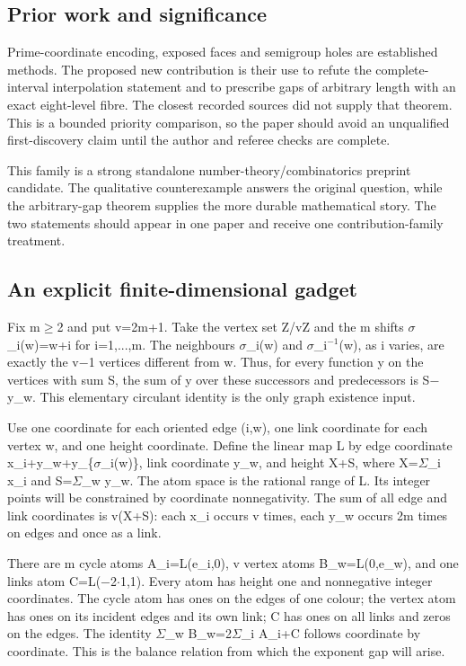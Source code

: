\documentclass[11pt,a4paper]{article}
\begin{document}
\subsection{Prior work and significance}
Prime-coordinate encoding, exposed faces and semigroup holes are established methods. The proposed new contribution is their use to refute the complete-interval interpolation statement and to prescribe gaps of arbitrary length with an exact eight-level fibre. The closest recorded sources did not supply that theorem. This is a bounded priority comparison, so the paper should avoid an unqualified first-discovery claim until the author and referee checks are complete.

This family is a strong standalone number-theory/combinatorics preprint candidate. The qualitative counterexample answers the original question, while the arbitrary-gap theorem supplies the more durable mathematical story. The two statements should appear in one paper and receive one contribution-family treatment.

\subsection{An explicit finite-dimensional gadget}
Fix m\ensuremath{\geq}2 and put v=2m+1. Take the vertex set Z/vZ and the m shifts \ensuremath{\sigma}\_i(w)=w+i for i=1,...,m. The neighbours \ensuremath{\sigma}\_i(w) and \ensuremath{\sigma}\_i\ensuremath{^{-1}}(w), as i varies, are exactly the v\ensuremath{-}1 vertices different from w. Thus, for every function y on the vertices with sum S, the sum of y over these successors and predecessors is S\ensuremath{-}y\_w. This elementary circulant identity is the only graph existence input.

Use one coordinate for each oriented edge (i,w), one link coordinate for each vertex w, and one height coordinate. Define the linear map L by edge coordinate x\_i+y\_w+y\_\{\ensuremath{\sigma}\_i(w)\}, link coordinate y\_w, and height X+S, where X=\ensuremath{\Sigma}\_i x\_i and S=\ensuremath{\Sigma}\_w y\_w. The atom space is the rational range of L. Its integer points will be constrained by coordinate nonnegativity. The sum of all edge and link coordinates is v(X+S): each x\_i occurs v times, each y\_w occurs 2m times on edges and once as a link.

There are m cycle atoms A\_i=L(e\_i,0), v vertex atoms B\_w=L(0,e\_w), and one links atom C=L(\ensuremath{-}2\ensuremath{\cdot}1,1). Every atom has height one and nonnegative integer coordinates. The cycle atom has ones on the edges of one colour; the vertex atom has ones on its incident edges and its own link; C has ones on all links and zeros on the edges. The identity \ensuremath{\Sigma}\_w B\_w=2\ensuremath{\Sigma}\_i A\_i+C follows coordinate by coordinate. This is the balance relation from which the exponent gap will arise.
\end{document}
